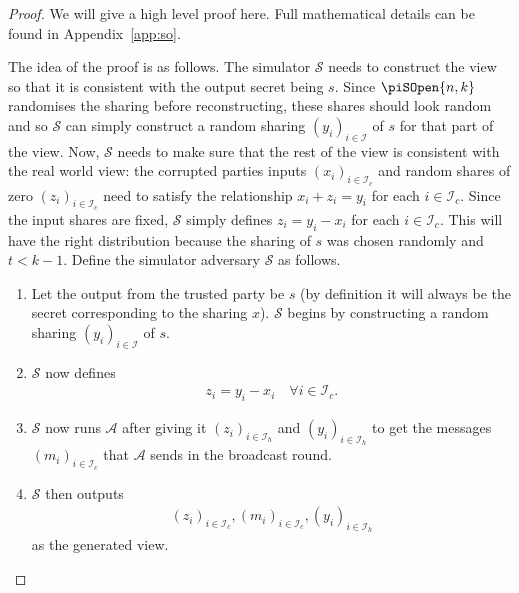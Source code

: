 \documentclass{article}
\theoremstyle{remark}
\begin{document}
\begin{proof}
	\newcommand{\proto}{\piSOpen{n,k}}

	We will give a high level proof here. Full mathematical details can be
	found in Appendix~\ref{app:so}.

	The idea of the proof is as follows. The simulator $\mathcal{S}$ needs to
	construct the view so that it is consistent with the output secret being
	$s$. Since $\piSOpen{n,k}$ randomises the sharing before reconstructing,
	these shares should look random and so $\mathcal{S}$ can simply construct a
	random sharing ${(y_i)}_{i \in \mathcal{I}}$ of $s$ for that part of the
	view. Now, $\mathcal{S}$ needs to make sure that the rest of the view is
	consistent with the real world view: the corrupted parties inputs
	${(x_i)}_{i \in \mathcal{I}_c}$ and random shares of zero ${(z_i)}_{i \in
	\mathcal{I}_c}$ need to satisfy the relationship $x_i + z_i = y_i$ for each
	$i \in \mathcal{I}_c$. Since the input shares are fixed, $\mathcal{S}$
	simply defines $z_i = y_i - x_i$ for each $i \in \mathcal{I}_c$. This will
	have the right distribution because the sharing of $s$ was chosen randomly
	and $t < k - 1$. Define the simulator adversary $\mathcal{S}$ as follows.

	\begin{enumerate}
		\item Let the output from the trusted party be $s$ (by definition it
			will always be the secret corresponding to the sharing $x$).
			$\mathcal{S}$ begins by constructing a random sharing ${(y_i)}_{i
			\in \mathcal{I}}$ of $s$.

		\item $\mathcal{S}$ now defines
			\begin{align}\label{eq:so_z}
				z_i = y_i - x_i \quad \forall i \in \mathcal{I}_c.
			\end{align}

		\item $\mathcal{S}$ now runs $\mathcal{A}$ after giving it ${(z_i)}_{i
			\in \mathcal{I}_h}$ and ${(y_i)}_{i \in \mathcal{I}_h}$ to get the
			messages ${(m_i)}_{i \in \mathcal{I}_c}$ that $\mathcal{A}$ sends
			in the broadcast round.

		\item $\mathcal{S}$ then outputs
			\begin{align*}
				{(z_i)}_{i \in \mathcal{I}_c},
				{(m_i)}_{i \in \mathcal{I}_c},
				{(y_i)}_{i \in \mathcal{I}_h}
			\end{align*}
			as the generated view.
	\end{enumerate}


\end{proof}
\end{document}
